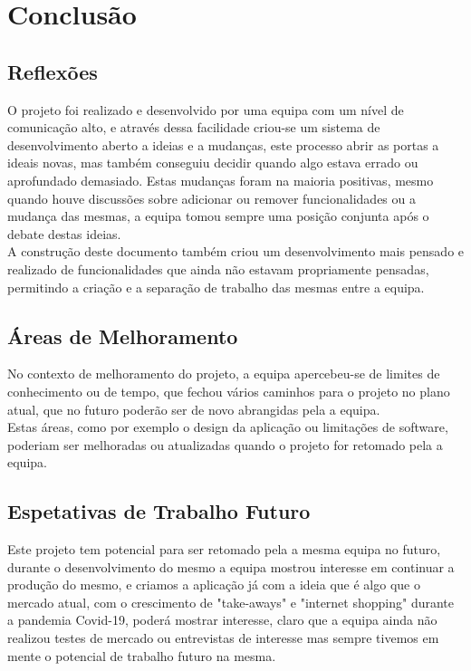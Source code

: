 \chapter{Conclusão}
\label{conclusão}
\section{Reflexões}
O projeto foi realizado e desenvolvido por uma equipa com um nível de comunicação alto, e através dessa facilidade criou-se um sistema de desenvolvimento aberto a ideias e a mudanças, este processo abrir as portas a ideais novas, mas também conseguiu decidir quando algo estava errado ou aprofundado demasiado. Estas mudanças foram na maioria positivas, mesmo quando houve discussões sobre adicionar ou remover funcionalidades ou a mudança das mesmas, a equipa tomou sempre uma posição conjunta após o debate destas ideias.\\
A construção deste documento também criou um desenvolvimento mais pensado e realizado de funcionalidades que ainda não estavam propriamente pensadas, permitindo a criação e a separação de trabalho das mesmas entre a equipa.
\section{Áreas de Melhoramento}
No contexto de melhoramento do projeto, a equipa apercebeu-se de limites de conhecimento ou de tempo, que fechou vários caminhos para o projeto no plano atual, que no futuro poderão ser de novo abrangidas pela a equipa.\\
Estas áreas, como por exemplo o design da aplicação ou limitações de software, poderiam ser melhoradas ou atualizadas quando o projeto for retomado pela a equipa. 
\section{Espetativas de Trabalho Futuro}
Este projeto tem potencial para ser retomado pela a mesma equipa no futuro, durante o desenvolvimento do mesmo a equipa mostrou interesse em continuar a produção do mesmo, e criamos a aplicação já com a ideia que é algo que o mercado atual, com o crescimento de "take-aways" e "internet shopping" durante a pandemia Covid-19, poderá mostrar interesse, claro que a equipa ainda não realizou testes de mercado ou entrevistas de interesse mas sempre tivemos em mente o potencial de trabalho futuro na mesma.